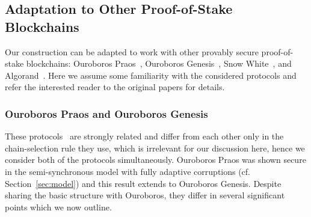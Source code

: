\subsection{Adaptation to Other Proof-of-Stake Blockchains}
\label{section:other}


Our construction can be adapted to work with other provably secure
proof-of-stake blockchains:
Ouroboros Praos~\cite{praos},
Ouroboros Genesis~\cite{genesis},
Snow White~\cite{snowwhite}, and
Algorand~\cite{algorand}.
Here we assume some familiarity with the
considered protocols and refer the interested reader to the original papers for
details.

\subsubsection{Ouroboros Praos and Ouroboros Genesis}

These protocols~\cite{praos,genesis} are strongly related and differ from each
other only in the chain-selection
rule they use, which is irrelevant for our discussion here, hence we
consider both of the protocols simultaneously.
Ouroboros Praos was shown secure in the
semi-synchronous model with fully adaptive corruptions (cf.
Section~\ref{sec:model}) and this result extends to Ouroboros Genesis.
Despite sharing the basic structure with Ouroboros,
they differ in several significant points which we now outline.

